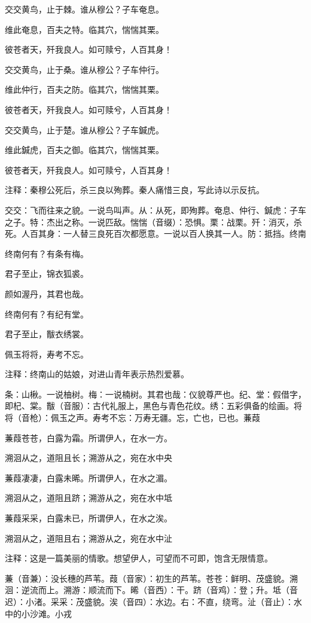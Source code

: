 \documentclass[12pt,UTF8]{ctexbook}
\begin{document}
交交黄鸟，止于棘。谁从穆公？子车奄息。

维此奄息，百夫之特。临其穴，惴惴其栗。

彼苍者天，歼我良人。如可赎兮，人百其身！

交交黄鸟，止于桑。谁从穆公？子车仲行。

维此仲行，百夫之防。临其穴，惴惴其栗。

彼苍者天，歼我良人。如可赎兮，人百其身！

交交黄鸟，止于楚。谁从穆公？子车鍼虎。

维此鍼虎，百夫之御。临其穴，惴惴其栗。

彼苍者天，歼我良人。如可赎兮，人百其身！

注释：秦穆公死后，杀三良以殉葬。秦人痛惜三良，写此诗以示反抗。

交交：飞而往来之貌。一说鸟叫声。从：从死，即殉葬。奄息、仲行、鍼虎：子车之子。特：杰出之称。一说匹敌。惴惴（音缀）：恐惧。栗：战栗。歼：消灭，杀死。人百其身：一人替三良死百次都愿意。一说以百人换其一人。防：抵挡。终南

终南何有？有条有梅。

君子至止，锦衣狐裘。

颜如渥丹，其君也哉。

终南何有？有纪有堂。

君子至止，黻衣绣裳。

佩玉将将，寿考不忘。

注释：终南山的姑娘，对进山青年表示热烈爱慕。

条：山楸。一说柚树。梅：一说楠树。其君也哉：仪貌尊严也。纪、堂：假借字，即杞、棠。黻（音服）：古代礼服上，黑色与青色花纹。绣：五彩俱备的绘画。将将（音枪）：佩玉之声。寿考不忘：万寿无疆。忘，亡也，已也。蒹葭

蒹葭苍苍，白露为霜。所谓伊人，在水一方。

溯洄从之，道阻且长；溯游从之，宛在水中央

蒹葭凄凄，白露未晞。所谓伊人，在水之湄。

溯洄从之，道阻且跻；溯游从之，宛在水中坻

蒹葭采采，白露未已，所谓伊人，在水之涘。

溯洄从之，道阻且右；溯游从之，宛在水中沚

注释：这是一篇美丽的情歌。想望伊人，可望而不可即，饱含无限情意。

蒹（音兼）：没长穗的芦苇。葭（音家）：初生的芦苇。苍苍：鲜明、茂盛貌。溯洄：逆流而上。溯游：顺流而下。晞（音西）：干。跻（音鸡）：登；升。坻（音迟）：小渚。采采：茂盛貌。涘（音四）：水边。右：不直，绕弯。沚（音止）：水中的小沙滩。小戎
\end{document}
